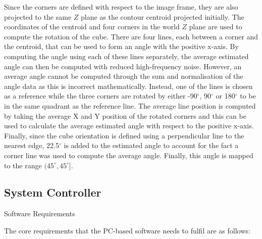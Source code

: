Since the corners are defined with respect to the image frame, they are also projected to the same $Z$ plane as the contour centroid projected initially. The coordinates of the centroid and four corners in the world $Z$ plane are used to compute the rotation of the cube. There are four lines, each between a corner and the centroid, that can be used to form an angle with the positive x-axis. By computing the angle using each of these lines separately, the average estimated angle can then be computed with reduced high-frequency noise. However, an average angle cannot be computed through the sum and normalisation of the angle data as this is incorrect mathematically. Instead, one of the lines is chosen as a reference while the three corners are rotated by either -90$^{\circ}$,  90$^{\circ}$ or  180$^{\circ}$ to be in the same quadrant as the reference line. The average line position is computed by taking the average X and Y position of the rotated corners and this can be used to calculate the average estimated angle with respect to the positive x-axis. Finally, since the cube orientation is defined using a perpendicular line to the nearest edge, 22.5$^{\circ}$ is added to the estimated angle to account for the fact a corner line was used to compute the average angle. Finally, this angle is mapped to the range $(45^{\circ},45^{\circ}]$.


\subsection{System Controller}

Software Requirements

The core requirements that the PC-based software needs to fulfil are as follows:

